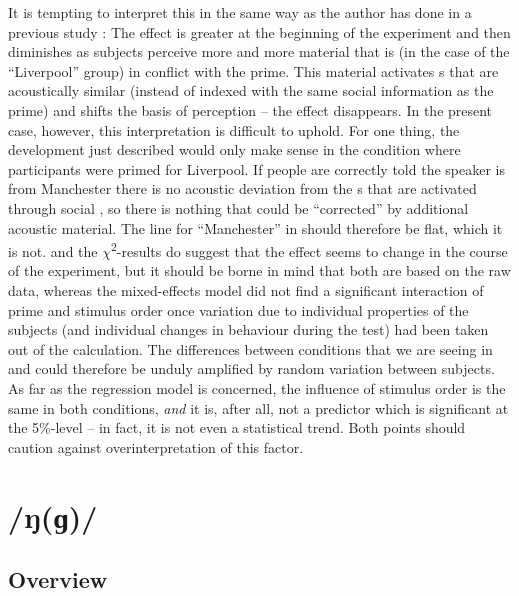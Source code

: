 It is tempting to interpret this in the same way as the author has done in a previous study \parencite[cf.][]{juskanma}: The  effect is greater at the beginning of the experiment and then diminishes as subjects perceive more and more material that is (in the case of the ``Liverpool'' group) in conflict with the prime.
This material activates s that are acoustically similar (instead of indexed with the same social information as the prime) and shifts the basis of perception -- the  effect disappears.
In the present case, however, this interpretation is difficult to uphold.
For one thing, the development just described would only make sense in the condition where participants were primed for Liverpool.
If people are correctly told the speaker is from Manchester there is no acoustic deviation from the s that are activated through social , so there is nothing that could be ``corrected'' by additional acoustic material.
The line for ``Manchester'' in  should therefore be flat, which it is not.
 and the \(\chi\)\textsuperscript{2}-results do suggest that the  effect seems to change in the course of the experiment, but it should be borne in mind that both are based on the raw data, whereas the mixed-effects model did not find a significant interaction of prime and stimulus order once variation due to individual properties of the subjects (and individual changes in behaviour during the test) had been taken out of the calculation.
The differences between conditions that we are seeing in  and  could therefore be unduly amplified by random variation between subjects.
As far as the regression model is concerned, the influence of stimulus order is the same in both conditions, \emph{and} it is, after all, not a predictor which is significant at the 5\%-level -- in fact, it is not even a statistical trend.
Both points should caution against overinterpretation of this factor.


\section{/ŋ(ɡ)/}
\label{sec.perc_res.ng}
	\subsection{Overview}
	\label{sec.perc_res.ng.overview}

